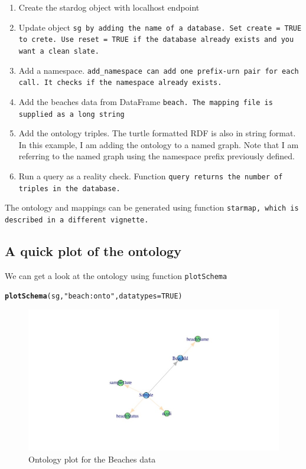 \documentclass{article}\usepackage[]{graphicx}\usepackage[]{xcolor}
\makeatletter
\newcommand{\hlnum}[1]{\textcolor[rgb]{0.686,0.059,0.569}{#1}}%
\newcommand{\hlstr}[1]{\textcolor[rgb]{0.192,0.494,0.8}{#1}}%
\newcommand{\hlstd}[1]{\textcolor[rgb]{0.345,0.345,0.345}{#1}}%
\newcommand{\hlkwc}[1]{\textcolor[rgb]{0.333,0.667,0.333}{#1}}%
\newcommand{\hlkwd}[1]{\textcolor[rgb]{0.737,0.353,0.396}{\textbf{#1}}}%
\newenvironment{kframe}{%
 \def\at@end@of@kframe{}%
 \ifinner\ifhmode%
  \def\at@end@of@kframe{\end{minipage}}%
  \begin{minipage}{\columnwidth}%
 \fi\fi%
 \def\FrameCommand##1{\hskip\@totalleftmargin \hskip-\fboxsep
 \colorbox{shadecolor}{##1}\hskip-\fboxsep
     \hskip-\linewidth \hskip-\@totalleftmargin \hskip\columnwidth}%
 \MakeFramed {\advance\hsize-\width
   \@totalleftmargin\z@ \linewidth\hsize
   \@setminipage}}%
 {\par\unskip\endMakeFramed%
 \at@end@of@kframe}
\newenvironment{knitrout}{}{} %
\makeatother
\begin{document}
\begin{enumerate}
  \item Create the stardog object with localhost endpoint
  \item Update object \tt{sg} by adding the name of a database. Set \tt{create = TRUE} to crete. Use \tt{reset = TRUE} if the database already exists and you want a clean slate.
  \item Add a namespace. \tt{add\_namespace} can add one prefix-urn pair for each call. It checks if the namespace already exists.
  \item Add the beaches data from DataFrame \tt{beach}. The mapping file is supplied as a long string
  \item Add the ontology triples. The turtle formatted RDF is also in string format. In this example, I am adding the ontology to a named graph. Note that I am referring to the named graph using the namespace prefix previously defined.
  \item Run a query as a reality check. Function \tt{query} returns the number of triples in the database.
\end{enumerate}

The ontology and mappings can be generated using function \tt{starmap}, which is described in a different vignette.

\subsection{A quick plot of the ontology}

We can get a look at the ontology using function \tt{plotSchema}

\begin{knitrout}
\color{fgcolor}\begin{kframe}
\begin{alltt}
\hlkwd{plotSchema}\hlstd{(sg,} \hlstr{"beach:onto"}\hlstd{,} \hlkwc{datatypes} \hlstd{=} \hlnum{TRUE}\hlstd{)}
\end{alltt}
\end{kframe}
\end{knitrout}

\begin{figure}[htbp]
\centerline{\includegraphics[scale = 0.5]{beachPlot.jpeg}}
\caption{Ontology plot for the Beaches data}
\label{fig}
\end{figure}
\end{document}

